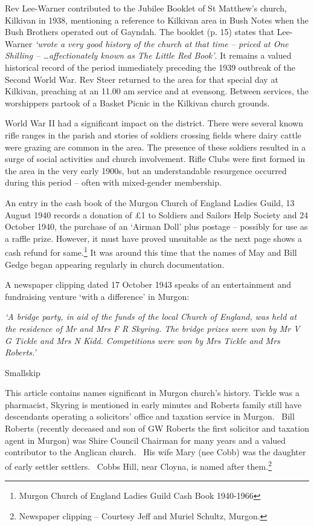 Rev Lee-Warner contributed to the Jubilee Booklet of St Matthew's church, Kilkivan in 1938, mentioning a reference to Kilkivan area in Bush Notes when the Bush Brothers operated out of Gayndah. The booklet (p. 15) states that Lee-Warner \emph{`wrote a very good history of the church at that time -- priced at One Shilling -- \ldots affectionately known as The Little Red Book'}. It remains a valued historical record of the period immediately preceding the 1939 outbreak of the Second World War. Rev Steer returned to the area for that special day at Kilkivan, preaching at an 11.00 am service and at evensong. Between services, the worshippers partook of a Basket Picnic in the Kilkivan church grounds.

World War II had a significant impact on the district. There were several known rifle ranges in the parish and stories of soldiers crossing fields where dairy cattle were grazing are common in the area. The presence of these soldiers resulted in a surge of social activities and church involvement. Rifle Clubs were first formed in the area in the very early 1900s, but an understandable resurgence occurred during this period -- often with mixed-gender membership.

An entry in the cash book of the Murgon Church of England Ladies Guild, 13 August 1940 records a donation of £1 to Soldiers and Sailors Help Society and 24 October 1940, the purchase of an `Airman Doll' plus postage -- possibly for use as a raffle prize. However, it must have proved unsuitable as the next page shows a cash refund for same.\footnote{Murgon Church of England Ladies Guild Cash Book 1940-1966} It was around this time that the names of May and Bill Gedge began appearing regularly in church documentation.

A newspaper clipping dated 17 October 1943 speaks of an entertainment and fundraising venture `with a difference' in Murgon:

\emph{`A bridge party, in aid of the funds of the local Church of England, was held at the residence of Mr and Mrs F R Skyring. The bridge prizes were won by Mr V G Tickle and Mrs N Kidd. Competitions were won by Mrs Tickle and Mrs Roberts.'}

Smallskip

This article contains names significant in Murgon church's history. Tickle was a pharmacist, Skyring is mentioned in early minutes and Roberts family still have descendants operating a solicitors' office and taxation service in Murgon.~ Bill Roberts (recently deceased and son of GW Roberts the first solicitor and taxation agent in Murgon) was Shire Council Chairman for many years and a valued contributor to the Anglican church.~ His wife Mary (nee Cobb) was the daughter of early settler settlers.~ Cobbs Hill, near Cloyna, is named after them.\footnote{Newspaper clipping -- Courtesy Jeff and Muriel Schultz, Murgon.}

